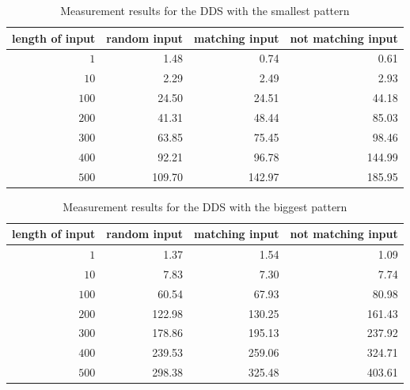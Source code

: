         \begin{table}
            \centering
            \caption{Measurement results for the DDS with the smallest pattern}     
            \label{tab:cep:measrun:small:dds}
            \begin{tabular}{rrrr}
                \toprule
                length of input & random input & matching input & not matching input \\ \midrule
                            $1$ &         1.48 &           0.74 &               0.61 \\
                           $10$ &         2.29 &           2.49 &               2.93 \\
                          $100$ &        24.50 &          24.51 &              44.18 \\
                          $200$ &        41.31 &          48.44 &              85.03 \\
                          $300$ &        63.85 &          75.45 &              98.46 \\
                          $400$ &        92.21 &          96.78 &             144.99 \\
                          $500$ &       109.70 &         142.97 &             185.95 \\ \bottomrule
            \end{tabular}
        \end{table}
    
        \begin{table}
            \centering
            \caption{Measurement results for the DDS with the biggest pattern}      
            \label{tab:cep:measrun:big:dds}
            \begin{tabular}{rrrr}
                \toprule
                length of input & random input & matching input & not matching input \\ \midrule
                            $1$ &         1.37 &           1.54 &               1.09 \\
                           $10$ &         7.83 &           7.30 &               7.74 \\
                          $100$ &        60.54 &          67.93 &              80.98 \\
                          $200$ &       122.98 &         130.25 &             161.43 \\
                          $300$ &       178.86 &         195.13 &             237.92 \\
                          $400$ &       239.53 &         259.06 &             324.71 \\
                          $500$ &       298.38 &         325.48 &             403.61 \\ \bottomrule
            \end{tabular}
        \end{table}
